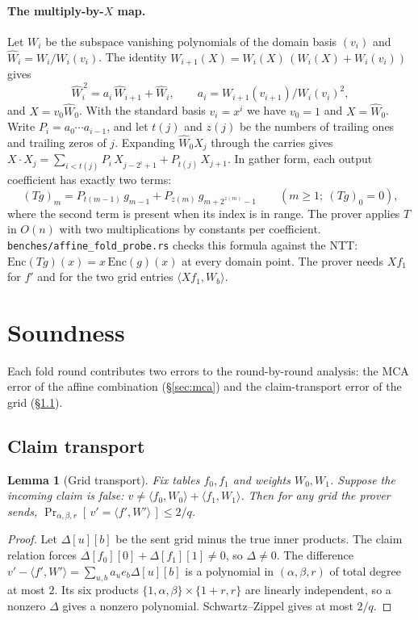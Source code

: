 \documentclass[11pt]{article}
\newcommand{\What}{\widehat W}
\newtheorem{lemma}[theorem]{Lemma}
\begin{document}
\paragraph{The multiply-by-$X$ map.} Let $W_i$ be the subspace
vanishing polynomials of the domain basis $(v_i)$ and $\What_i = W_i /
W_i(v_i)$. The identity $W_{i+1}(X) = W_i(X)\,(W_i(X) + W_i(v_i))$
gives
\[
  \What_i^{\,2} = a_i\, \What_{i+1} + \What_i, \qquad a_i =
  W_{i+1}(v_{i+1}) / W_i(v_i)^2,
\]
and $X = v_0 \What_0$. With the standard basis $v_i = x^i$ we have
$v_0 = 1$ and $X = \What_0$. Write $P_i = a_0 \cdots a_{i-1}$, and let
$t(j)$ and $z(j)$ be the numbers of trailing ones and trailing zeros of
$j$. Expanding $\What_0 X_j$ through the carries gives
$X \cdot X_j = \sum_{i < t(j)} P_i\, X_{j - 2^i + 1} + P_{t(j)}\,
X_{j+1}$. In gather form, each output coefficient has exactly two
terms:
\[
  (T g)_m = P_{t(m-1)}\, g_{m-1} + P_{z(m)}\, g_{m + 2^{z(m)} - 1}
  \qquad (m \ge 1;\ (Tg)_0 = 0),
\]
where the second term is present when its index is in range. The
prover applies $T$ in $O(n)$ with two multiplications by constants per
coefficient. \texttt{benches/affine\_fold\_probe.rs} checks this
formula against the NTT: $\mathrm{Enc}(Tg)(x) = x\,\mathrm{Enc}(g)(x)$
at every domain point. The prover
needs $Xf_1$ for $f'$ and for the two grid entries $\langle Xf_1,
W_b\rangle$.

\section{Soundness}\label{sec:soundness}

Each fold round contributes two errors to the round-by-round
analysis: the MCA error of the affine combination
(\S\ref{sec:mca}) and the claim-transport error of the grid
(\S\ref{sec:transport}).

\subsection{Claim transport}\label{sec:transport}

\begin{lemma}[Grid transport]\label{lem:transport}
Fix tables $f_0, f_1$ and weights $W_0, W_1$. Suppose the incoming
claim is false: $v \ne \langle f_0, W_0\rangle + \langle f_1,
W_1\rangle$. Then for any grid the prover sends,
$\Pr_{\alpha, \beta, r}[\, v' = \langle f', W'\rangle \,] \le 2/q$.
\end{lemma}

\begin{proof}
Let $\Delta[u][b]$ be the sent grid minus the true inner products. The
claim relation forces $\Delta[f_0][0] + \Delta[f_1][1] \ne 0$, so
$\Delta \ne 0$. The difference $v' - \langle f', W'\rangle =
\sum_{u, b} a_u e_b \Delta[u][b]$ is a polynomial in $(\alpha, \beta,
r)$ of total degree at most $2$. Its six products $\{1, \alpha,
\beta\} \times \{1 + r, r\}$ are linearly independent, so a nonzero
$\Delta$ gives a nonzero polynomial. Schwartz--Zippel gives at most
$2/q$.
\end{proof}
\end{document}
